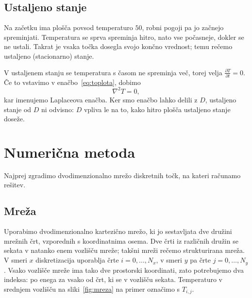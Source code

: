 \documentclass[a4paper,11pt]{article}
\begin{document}
	\subsection{Ustaljeno stanje}
	
	Na začetku ima plošča povsod temperaturo $50$, robni pogoji pa jo začnejo spreminjati. Temperatura se sprva spreminja hitro, nato vse počasneje, dokler se ne ustali. Takrat je vsaka točka dosegla svojo končno vrednost; temu rečemo ustaljeno (stacionarno) stanje.
	
	V ustaljenem stanju se temperatura s časom ne spreminja več, torej velja $\frac{\partial T}{\partial t} = 0$. Če to vstavimo v enačbo~\eqref{eq:toplota}, dobimo
	\begin{equation}
		\nabla^2 T = 0,
		\label{eq:laplace}
	\end{equation}
	kar imenujemo Laplaceova enačba. Ker smo enačbo lahko delili z $D$, ustaljeno stanje od $D$ ni odvisno: $D$ vpliva le na to, kako hitro plošča ustaljeno stanje doseže.
	
	\newpage
	\section{Numerična metoda}
	
	Najprej zgradimo dvodimenzionalno mrežo diskretnih točk, na kateri računamo rešitev.
	
	\subsection{Mreža}
	
	Uporabimo dvodimenzionalno kartezično mrežo, ki jo sestavljata dve družini mrežnih črt, vzporednih s koordinatnima osema. Dve črti iz različnih družin se sekata v natanko enem vozlišču mreže; takšni mreži rečemo strukturirana mreža. V smeri $x$ diskretizacija uporablja črte $i = 0, \dots, N_x$, v smeri $y$ pa črte $j = 0, \dots, N_y$. Vsako vozlišče mreže ima tako dve prostorski koordinati, zato potrebujemo dva indeksa: po enega za vsako od črt, ki se v vozlišču sekata. Temperaturo v srednjem vozlišču na sliki~\ref{fig:mreza} na primer označimo s $T_{i,j}$.
	
\end{document}

